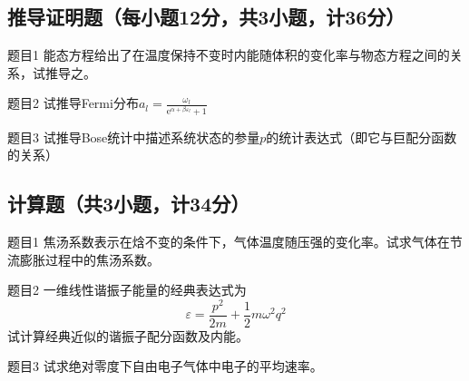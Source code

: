 \subsection{推导证明题（每小题12分，共3小题，计36分）}
\begin{question}{题目1}
    能态方程给出了在温度保持不变时内能随体积的变化率与物态方程之间的关系，试推导之。
\end{question}

\begin{question}{题目2}
    试推导Fermi分布$\displaystyle a_l=\frac{\omega_l}{\mathrm{e}^{\alpha+\beta\varepsilon_l}+1}$
\end{question}

\begin{question}{题目3}
    试推导Bose统计中描述系统状态的参量$p$的统计表达式（即它与巨配分函数的关系）
\end{question}


\subsection{计算题（共3小题，计34分）}
\begin{question}{题目1}
    焦汤系数表示在焓不变的条件下，气体温度随压强的变化率。试求气体在节流膨胀过程中的焦汤系数。
\end{question}
\begin{question}{题目2}
    一维线性谐振子能量的经典表达式为
    $$
        \varepsilon=\frac{p^2}{2m}+\frac{1}{2}m\omega^2q^2
    $$
    试计算经典近似的谐振子配分函数及内能。
\end{question}
\begin{question}{题目3}
    试求绝对零度下自由电子气体中电子的平均速率。
\end{question}
